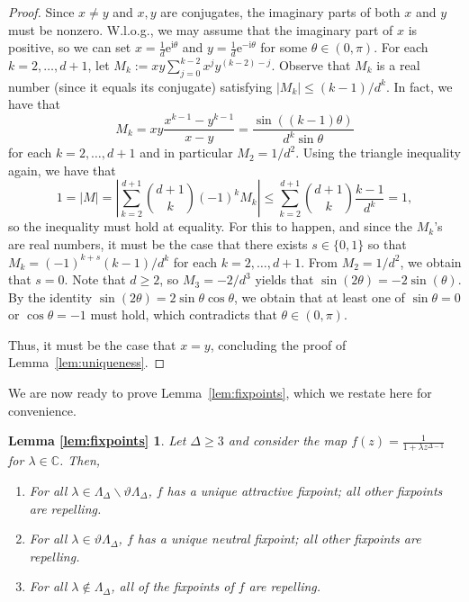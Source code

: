 \documentclass[11pt]{article}
\newtheorem*{lemfixpoints}{Lemma \ref{lem:fixpoints}}
\def\Complex{\mathbb{C}}
\def\LambdaD{\Lambda_\Delta}
\def\tLambdaD{\vartheta\Lambda_\Delta}
\newcommand{\im}{\mathrm{i}}
\newcommand{\emm}{\mathrm{e}}
\newcommand{\abs}[1]{\left|#1\right|}
\begin{document}
\begin{proof}
Since $x\neq y$ and $x,y$ are conjugates, the imaginary parts of both $x$ and $y$ must be nonzero. W.l.o.g., we may assume that the imaginary part of $x$ is positive, so we can set $x=\frac{1}{d}\emm^{\im \theta}$ and $y=\frac{1}{d}\emm^{-\im \theta}$ for some $\theta\in(0,\pi)$. For each $k=2,\hdots,d+1$, let 
$M_k:=xy\sum^{k-2}_{j=0}x^{j}y^{(k-2)-j}$. Observe that $M_k$ is a real number (since it  equals its conjugate) satisfying $|M_k|\leq (k-1)/d^{k}$. In fact, we have that 
\[M_k=xy\frac{x^{k-1}-y^{k-1}}{x-y}=\frac{\sin((k-1) \theta)}{d^k\sin \theta}\]
for each $k=2,\hdots,d+1$ and in particular $M_2=1/d^2$.
Using the triangle inequality again, we have that 
\[1=\abs{M}=\abs{\sum^{d+1}_{k=2}\binom{d+1}{k}(-1)^{k}M_k}\leq \sum^{d+1}_{k=2}\binom{d+1}{k}\frac{k-1}{d^k}=1,\]
so the inequality must hold at equality. For this to happen, and since the $M_k$'s are real numbers, it must be the case that there exists $s\in\{0,1\}$ so that $M_k=(-1)^{k+s}(k-1)/d^{k}$ for each $k=2,\hdots,d+1$. From $M_2=1/d^2$, we obtain that $s=0$. Note that $d\geq 2$, so $M_3=-2/d^3$ yields that $\sin(2\theta)=-2\sin(\theta)$. By the identity $\sin(2\theta)=2\sin\theta\cos\theta$, we obtain that at least one of $\sin\theta=0$ or $\cos\theta=-1$ must hold, which contradicts  that $\theta\in(0,\pi)$. 

Thus, it must be the case that $x=y$, concluding the proof of Lemma~\ref{lem:uniqueness}. 
\end{proof}
We are now ready to prove Lemma~\ref{lem:fixpoints}, which we restate here for convenience.  
\newcommand{\statelemfixpoints}{
Let $\Delta\geq 3$ and consider the map $f(z)=\frac{1}{1+\lambda z^{\Delta-1}}$ for $\lambda \in\Complex$. Then,
\begin{enumerate}
\item For all $\lambda\in \LambdaD\backslash \tLambdaD$, $f$ has a unique attractive fixpoint; all other fixpoints are repelling.
\item  For all $\lambda\in \tLambdaD$, $f$ has a unique neutral fixpoint; all other fixpoints are repelling.
\item For all $\lambda\notin \LambdaD$, all of the fixpoints of $f$ are repelling.
}
\begin{lemfixpoints}
Let $\Delta\geq 3$ and consider the map $f(z)=\frac{1}{1+\lambda z^{\Delta-1}}$ for $\lambda \in\Complex$. Then,
\begin{enumerate}
\item \label{it:interior} For all $\lambda\in \LambdaD\backslash \tLambdaD$, $f$ has a unique attractive fixpoint; all other fixpoints are repelling.
\item \label{it:boundary} For all $\lambda\in \tLambdaD$, $f$ has a unique neutral fixpoint; all other fixpoints are repelling.
\item \label{it:exterior} For all $\lambda\notin \LambdaD$, all of the fixpoints of $f$ are repelling.
\end{enumerate}
\end{lemfixpoints}
\end{document}
